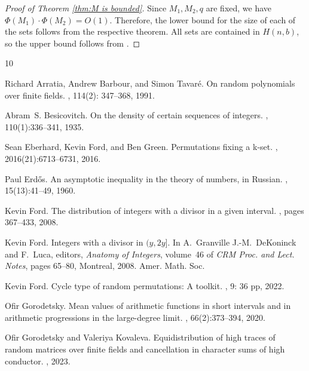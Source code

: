 \documentclass[12pt]{amsart}
\numberwithin{equation}{section}
\theoremstyle{definition}
\theoremstyle{remark}
\begin{document}
\begin{proof}[Proof of Theorem \ref{thm:M is bounded}]
    Since $M_1, M_2, q$ are fixed, we have $\Phi(M_1) \cdot \Phi(M_2) = O(1)$. Therefore, the lower bound for the size of each of the sets follows from the respective theorem.  All sets are contained in $H(n,b)$, so the upper bound follows from \cite[Theorem 1.2]{Meisner_MT}.
\end{proof}





\begin{thebibliography}{10}

Richard Arratia, Andrew Barbour, and Simon Tavar\'e.
\newblock On random polynomials over finite fields.
, 114(2): 347--368, 1991. 

Abram~S. Besicovitch.
\newblock On the density of certain sequences of integers.
, 110(1):336--341, 1935.

Sean Eberhard, Kevin Ford, and Ben Green.
\newblock Permutations fixing a k-set.
,
  2016(21):6713--6731, 2016.

Paul Erd\H{o}s.
\newblock An asymptotic inequality in the theory of numbers, in {R}ussian.
, 15(13):41--49, 1960.

Kevin Ford.
\newblock The distribution of integers with a divisor in a given interval.
, pages 367--433, 2008.

Kevin Ford.
\newblock Integers with a divisor in $(y, 2y]$.
\newblock In A.~Granville J.-M.~DeKoninck and F.~Luca, editors, {\em Anatomy of
  Integers}, volume~46 of {\em CRM Proc. and Lect. Notes}, pages 65--80,
  Montreal, 2008. Amer. Math. Soc.

Kevin Ford.
\newblock Cycle type of random permutations: A toolkit. 
, 9: 36 pp, 2022.

Ofir Gorodetsky.
\newblock Mean values of arithmetic functions in short intervals and in
arithmetic progressions in the large-degree limit.
, 66(2):373--394, 2020.

Ofir Gorodetsky and Valeriya Kovaleva. 
\newblock Equidistribution of high traces of random matrices over finite fields and cancellation in character sums of high conductor.
, 2023. 


\end{thebibliography}
\end{document}
